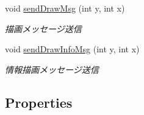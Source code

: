 \begin{DoxyCompactItemize}
void \hyperlink{class_reversi_form_1_1_reversi_play_aaad592cdd92fb4efd6132c7cf1871e1f}{send\+Draw\+Msg} (int y, int x)
\begin{DoxyCompactList}\small\item\em 描画メッセージ送信 \end{DoxyCompactList}\item 
void \hyperlink{class_reversi_form_1_1_reversi_play_a08062d3bd42d1780a6931b44a925503d}{send\+Draw\+Info\+Msg} (int y, int x)
\begin{DoxyCompactList}\small\item\em 情報描画メッセージ送信 \end{DoxyCompactList}\end{DoxyCompactItemize}
\subsection*{Properties}
